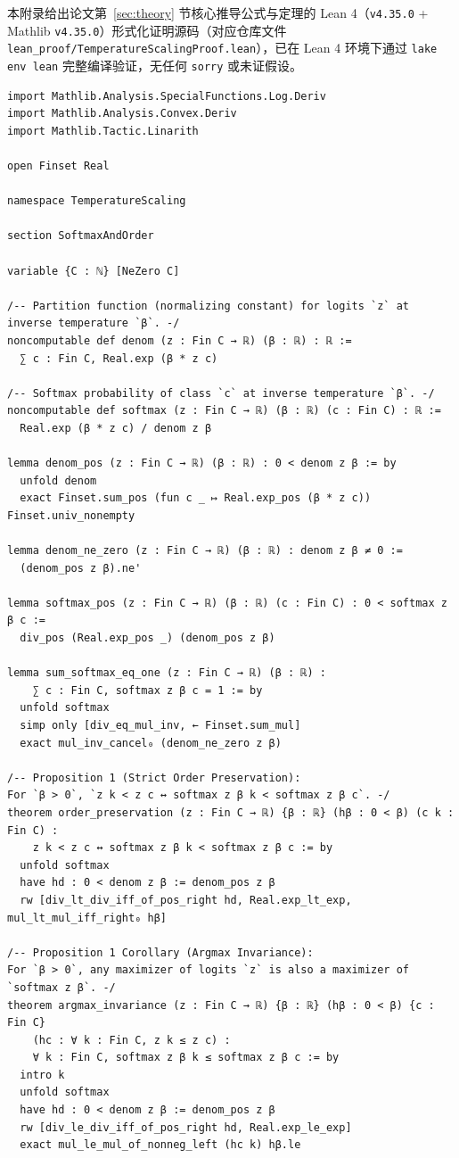 本附录给出论文第~\ref{sec:theory} 节核心推导公式与定理的 Lean 4（\texttt{v4.35.0} + Mathlib \texttt{v4.35.0}）形式化证明源码（对应仓库文件 \texttt{lean\_proof/TemperatureScalingProof.lean}），已在 Lean 4 环境下通过 \texttt{lake env lean} 完整编译验证，无任何 \texttt{sorry} 或未证假设。

{\scriptsize
\begin{verbatim}
import Mathlib.Analysis.SpecialFunctions.Log.Deriv
import Mathlib.Analysis.Convex.Deriv
import Mathlib.Tactic.Linarith

open Finset Real

namespace TemperatureScaling

section SoftmaxAndOrder

variable {C : ℕ} [NeZero C]

/-- Partition function (normalizing constant) for logits `z` at inverse temperature `β`. -/
noncomputable def denom (z : Fin C → ℝ) (β : ℝ) : ℝ :=
  ∑ c : Fin C, Real.exp (β * z c)

/-- Softmax probability of class `c` at inverse temperature `β`. -/
noncomputable def softmax (z : Fin C → ℝ) (β : ℝ) (c : Fin C) : ℝ :=
  Real.exp (β * z c) / denom z β

lemma denom_pos (z : Fin C → ℝ) (β : ℝ) : 0 < denom z β := by
  unfold denom
  exact Finset.sum_pos (fun c _ ↦ Real.exp_pos (β * z c)) Finset.univ_nonempty

lemma denom_ne_zero (z : Fin C → ℝ) (β : ℝ) : denom z β ≠ 0 :=
  (denom_pos z β).ne'

lemma softmax_pos (z : Fin C → ℝ) (β : ℝ) (c : Fin C) : 0 < softmax z β c :=
  div_pos (Real.exp_pos _) (denom_pos z β)

lemma sum_softmax_eq_one (z : Fin C → ℝ) (β : ℝ) :
    ∑ c : Fin C, softmax z β c = 1 := by
  unfold softmax
  simp only [div_eq_mul_inv, ← Finset.sum_mul]
  exact mul_inv_cancel₀ (denom_ne_zero z β)

/-- Proposition 1 (Strict Order Preservation):
For `β > 0`, `z k < z c ↔ softmax z β k < softmax z β c`. -/
theorem order_preservation (z : Fin C → ℝ) {β : ℝ} (hβ : 0 < β) (c k : Fin C) :
    z k < z c ↔ softmax z β k < softmax z β c := by
  unfold softmax
  have hd : 0 < denom z β := denom_pos z β
  rw [div_lt_div_iff_of_pos_right hd, Real.exp_lt_exp, mul_lt_mul_iff_right₀ hβ]

/-- Proposition 1 Corollary (Argmax Invariance):
For `β > 0`, any maximizer of logits `z` is also a maximizer of `softmax z β`. -/
theorem argmax_invariance (z : Fin C → ℝ) {β : ℝ} (hβ : 0 < β) {c : Fin C}
    (hc : ∀ k : Fin C, z k ≤ z c) :
    ∀ k : Fin C, softmax z β k ≤ softmax z β c := by
  intro k
  unfold softmax
  have hd : 0 < denom z β := denom_pos z β
  rw [div_le_div_iff_of_pos_right hd, Real.exp_le_exp]
  exact mul_le_mul_of_nonneg_left (hc k) hβ.le


\end{verbatim}}
